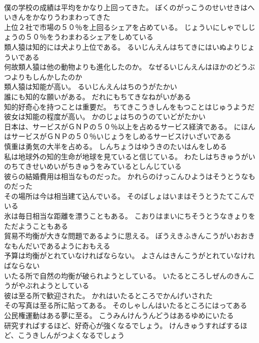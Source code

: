 \documentclass[8pt]{extreport}
\begin{document}
\begin{CJK}{UTF8}{min}
\\	僕の学校の成績は平均をかなり上回ってきた。	ぼくのがっこうのせいせきはへいきんをかなりうわまわってきた 
\\	上位２社で市場の５０％を上回るシェアを占めている。	じょういにしゃでしじょうの５０％をうわまわるシェアをしめている 
\\	類人猿は知的には犬より上位である。	るいじんえんはちてきにはいぬよりじょういである 
\\	何故類人猿は他の動物よりも進化したのか。	なぜるいじんえんはほかのどうぶつよりもしんかしたのか 
\\	類人猿は知能が高い。	るいじんえんはちのうがたかい 
\\	誰にも知的な願いがある。	だれにもちてきなねがいがある 
\\	知的好奇心を持つことは重要だ。	ちてきこうきしんをもつことはじゅうようだ 
\\	彼女は知能の程度が高い。	かのじょはちのうのていどがたかい 
\\	日本は、サービスがＧＮＰの５０％以上を占めるサービス経済である。	にほんはサービスがＧＮＰの５０％いじょうをしめるサービスけいざいである 
\\	慎重は勇気の大半を占める。	しんちょうはゆうきのたいはんをしめる 
\\	私は地球外の知的生命が地球を見ていると信じている。	わたしはちきゅうがいのちてきせいめいがちきゅうをみているとしんじている 
\\	彼らの結婚費用は相当なものだった。	かれらのけっこんひようはそうとうなものだった 
\\	その場所は今は相当建て込んでいる。	そのばしょはいまはそうとうたてこんでいる 
\\	氷は毎日相当な距離を漂うこともある。	こおりはまいにちそうとうなきょりをただようこともある 
\\	貿易不均衡が大きな問題であるように思える。	ぼうえきふきんこうがいおおきなもんだいであるようにおもえる 
\\	予算は均衡がとれていなければならない。	よさんはきんこうがとれていなければならない 
\\	いたる所で自然の均衡が破られようとしている。	いたるところしぜんのきんこうがやぶれようとしている 
\\	彼は至る所で歓迎された。	かれはいたるところでかんげいされた 
\\	その写真は至る所に貼ってある。	そのしゃしんはいたるところにはってある 
\\	公民権運動はある夢に至る。	こうみんけんうんどうはあるゆめにいたる 
\\	研究すればするほど、好奇心が強くなるでしょう。	けんきゅうすればするほど、こうきしんがつよくなるでしょう 

\end{CJK}
\end{document}

